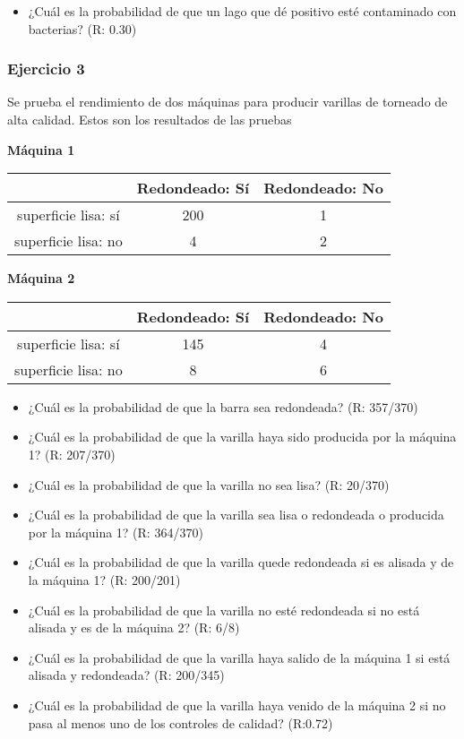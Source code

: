\documentclass[
]{book}
\providecommand{\tightlist}{%
  \setlength{\itemsep}{0pt}\setlength{\parskip}{0pt}}
\begin{document}
\begin{itemize}
\tightlist
\item
  ¿Cuál es la probabilidad de que un lago que dé positivo esté contaminado con bacterias? (R: 0.30)
\end{itemize}

\hypertarget{ejercicio-3}{%
\subsubsection{Ejercicio 3}\label{ejercicio-3}}

Se prueba el rendimiento de dos máquinas para producir varillas de torneado de alta calidad. Estos son los resultados de las pruebas

\textbf{Máquina 1}

\begin{longtable}[]{@{}ccc@{}}
\toprule
& Redondeado: Sí & Redondeado: No \\
\midrule
\endhead
superficie lisa: sí & 200 & 1 \\
superficie lisa: no & 4 & 2 \\
\bottomrule
\end{longtable}

\textbf{Máquina 2}

\begin{longtable}[]{@{}ccc@{}}
\toprule
& Redondeado: Sí & Redondeado: No \\
\midrule
\endhead
superficie lisa: sí & 145 & 4 \\
superficie lisa: no & 8 & 6 \\
\bottomrule
\end{longtable}

\begin{itemize}
\tightlist
\item
  ¿Cuál es la probabilidad de que la barra sea redondeada? (R: 357/370)
\item
  ¿Cuál es la probabilidad de que la varilla haya sido producida por la máquina 1? (R: 207/370)
\item
  ¿Cuál es la probabilidad de que la varilla no sea lisa? (R: 20/370)
\item
  ¿Cuál es la probabilidad de que la varilla sea lisa o redondeada o producida por la máquina 1? (R: 364/370)
\item
  ¿Cuál es la probabilidad de que la varilla quede redondeada si es alisada y de la máquina 1? (R: 200/201)
\item
  ¿Cuál es la probabilidad de que la varilla no esté redondeada si no está alisada y es de la máquina 2? (R: 6/8)
\item
  ¿Cuál es la probabilidad de que la varilla haya salido de la máquina 1 si está alisada y redondeada? (R: 200/345)
\item
  ¿Cuál es la probabilidad de que la varilla haya venido de la máquina 2 si no pasa al menos uno de los controles de calidad? (R:0.72)
\end{itemize}
\end{document}
